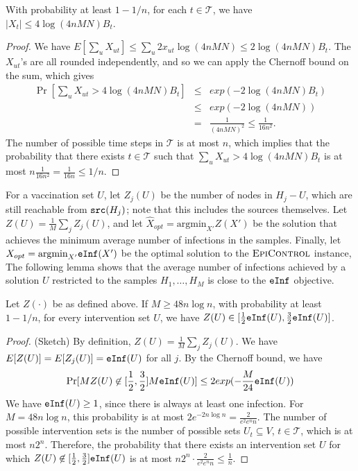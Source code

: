 \noindent
\begin{lemma}
\label{lem:budget}
With probability at least $1-1/n$, for each $t\in \mathcal{T}$, we have
$|X_t|\leq 4\log(4nMN)B_t$.
\end{lemma}
\begin{proof}
We have $E[\sum_u X_{ut}]\leq \sum_u 2x_{ut}\log(4nMN) \leq 2\log(4nMN)B_t$.
The $X_{ut}$'s are all rounded independently, and so we can apply the Chernoff bound on the sum, which gives
\begin{eqnarray*}
\Pr[\sum_u X_{ut} > 4\log(4nMN)B_t] &\leq& exp(-2\log(4nMN)B_t)\\
&\leq& exp(-2\log(4nMN))\\
&=& \frac{1}{(4nMN)^2}\leq \frac{1}{16n^2}.
\end{eqnarray*}
The number of possible time steps in $\mathcal{T}$ is at most $n$, which implies that the probability that there exists 
$t\in\mathcal{T}$ such that $\sum_u X_{ut} > 4\log(4nMN)B_t$ is at most $n\frac{1}{16n^2}=\frac{1}{16n}\leq 1/n$.
\end{proof}

For a vaccination set $U$, let $Z_j(U)$ be the number of nodes in 
$H_j-U$, which are still reachable from $\texttt{src}(H_j)$;
note that this includes the sources themselves.
Let $Z(U)=\frac{1}{M}\sum_j Z_j(U)$, and let $\hat{X}_{opt}=\mbox{argmin}_{X'}Z(X')$ be the solution that
achieves the minimum average number of infections in the samples.
Finally, let $X_{opt}=\mbox{argmin}_{X'}\texttt{eInf}(X')$ be the optimal solution to the $\textsc{EpiControl}{}$ instance,
The following lemma shows that the average number of infections achieved by a solution $U$ restricted to
the samples $H_1,\ldots,H_M$ is close to the $\texttt{eInf}$ objective.

\begin{lemma}
\label{lemma:conc}
Let $Z(\cdot)$ be as defined above. If $M\geq 48n\log{n}$, with probability at least $1-1/n$, for every intervention set $U$,
we have $Z(U)\in [\frac{1}{2}\texttt{eInf}(U), \frac{3}{2}\texttt{eInf}(U)]$.
\end{lemma}
\begin{proof} (Sketch)
By definition, $Z(U)=\frac{1}{M}\sum_j Z_j(U)$.
We have $E[Z(U)] = E[Z_j(U)]=\texttt{eInf}(U)$ for all $j$.
By the Chernoff bound, we have
\[
\Pr[MZ(U)\not\in [\frac{1}{2}, \frac{3}{2}]M\texttt{eInf}(U)]\leq 2exp(-\frac{M}{24}\texttt{eInf}(U))
\]
We have $\texttt{eInf}(U)\geq 1$, since there is always at least one infection.
For $M=48n\log{n}$, this probability is at most $2e^{-2n\log{n}} = \frac{2}{e^2e^nn}$.
The number of possible intervention sets is the number of possible sets $U_t\subseteq V$, $t\in\mathcal{T}$,
which is at most $n2^n$.
Therefore, the probability that there exists an intervention set $U$ for which
$Z(U)\not\in [\frac{1}{2}, \frac{3}{2}]\texttt{eInf}(U)$ is at most $n2^n\cdot \frac{2}{e^2e^nn}\leq \frac{1}{n}$.
\end{proof}

